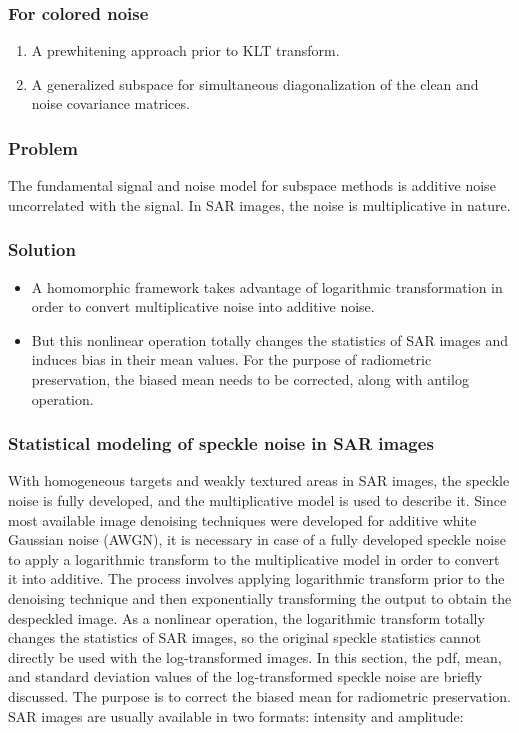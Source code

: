 \subsubsection*{For colored noise}
\begin{enumerate}
\item A prewhitening approach prior to KLT transform.
\item A generalized subspace for simultaneous diagonalization of the clean and
noise covariance matrices.
\end{enumerate}

\subsubsection*{Problem}
The fundamental signal and noise model for subspace methods is additive noise uncorrelated with the signal. In SAR images, the noise is multiplicative in nature.

\subsubsection*{Solution}
\begin{itemize}
	\item A homomorphic framework takes advantage of logarithmic transformation in order to convert multiplicative noise into additive noise.
	\item But this nonlinear operation totally changes the statistics of SAR images and
induces bias in their mean values. For the purpose of radiometric preservation, the biased mean needs to be corrected, along with antilog operation.
\end{itemize}

\subsubsection{Statistical modeling of speckle noise in SAR images}
With homogeneous targets and weakly textured areas in SAR images, the speckle noise is fully developed, and the multiplicative model is used to describe it. Since
most available image denoising techniques were developed for additive white Gaussian noise (AWGN), it is necessary in case of a fully developed speckle noise to apply a logarithmic transform to the multiplicative model in order to convert it into additive. The process involves applying logarithmic transform prior to the denoising technique and then exponentially transforming the output to obtain the despeckled image. As a nonlinear operation, the logarithmic transform totally changes the statistics of SAR images, so the original speckle statistics cannot directly be used with
the log-transformed images. In this section, the pdf, mean, and standard deviation values of the log-transformed speckle noise are briefly discussed. The purpose is to correct the biased mean for radiometric preservation. SAR images are usually available in two formats: intensity and amplitude:

